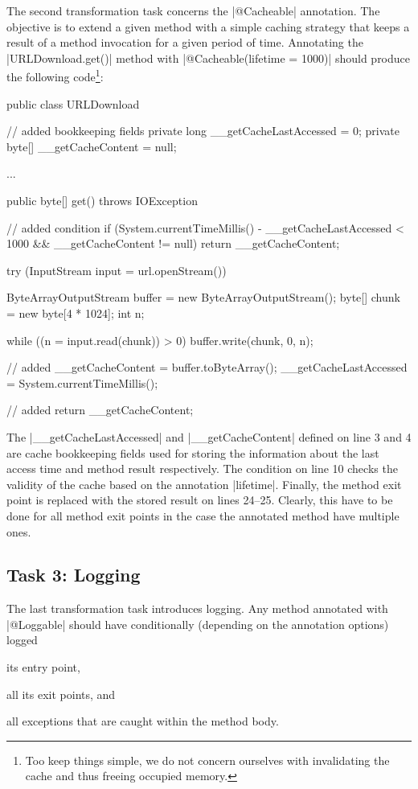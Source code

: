 The second transformation task concerns the \javainline|@Cacheable| annotation.
The objective is to extend a given method with a simple caching strategy that keeps a result of a method invocation for a given period of time.
Annotating the \javainline|URLDownload.get()| method with \javainline|@Cacheable(lifetime = 1000)| should produce the following code\footnote{Too keep things simple, we do not concern ourselves with invalidating the cache and thus freeing occupied memory.}:
%
\begin{javacode}
public class URLDownload {
  // added bookkeeping fields
  private long __getCacheLastAccessed = 0;
  private byte[] __getCacheContent = null;

  ...

  public byte[] get() throws IOException {
    // added condition
    if (System.currentTimeMillis() - __getCacheLastAccessed < 1000 && __getCacheContent != null) {
      return __getCacheContent;
    }

    try (InputStream input = url.openStream()) {
      ByteArrayOutputStream buffer = new ByteArrayOutputStream();
      byte[] chunk = new byte[4 * 1024];
      int n;

      while ((n = input.read(chunk)) > 0) {
        buffer.write(chunk, 0, n);
      }

      // added
      __getCacheContent = buffer.toByteArray();
      __getCacheLastAccessed = System.currentTimeMillis();
      
      // added
      return __getCacheContent;
    }
  }
}
\end{javacode}

The \javainline|__getCacheLastAccessed| and \javainline|__getCacheContent| defined on line 3 and 4 are cache bookkeeping fields used for storing the information about the last access time and method result respectively.
The condition on line 10 checks the validity of the cache based on the annotation \javainline|lifetime|.
Finally, the method exit point is replaced with the stored result on lines 24--25.
Clearly, this have to be done for all method exit points in the case the annotated method have multiple ones.

\subsection{Task 3: Logging}

The last transformation task introduces logging.
Any method annotated with \javainline|@Loggable| should have conditionally (depending on the annotation options) logged
\begin{inparaenum}[(i)]
\item its entry point, 
\item all its exit points, and 
\item all exceptions that are caught within the method body. 
\end{inparaenum}


